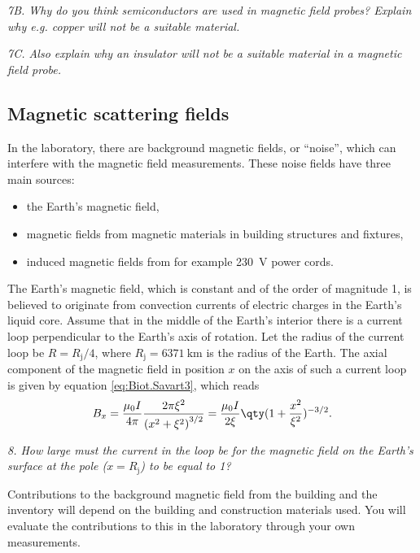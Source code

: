 \documentclass[../Elmag-labhefte-2020.tex]{subfiles}
\begin{document}
\emph{7B. Why do you think semiconductors are used in magnetic field probes? Explain why e.g. copper will not be a suitable material.}

\emph{7C. Also explain why an insulator will not be a suitable material in a magnetic field probe.}


\subsection{Magnetic scattering fields}

In the laboratory, there are background magnetic fields, or ``noise'', which can interfere with the magnetic field measurements.
These noise fields have three main sources:
\vspace{-4mm}
\begin{itemize}
    \item the Earth's magnetic field,
    \item magnetic fields from magnetic materials in building structures and fixtures,
    \item induced magnetic fields from for example \SI{230}{\volt} power cords.
\end{itemize}

The Earth's magnetic field, which is constant and of the order of magnitude \SI{1}{\gauss}, is believed to originate from convection currents of electric charges in the Earth's liquid core. Assume that in the middle of the Earth's interior there is a current loop perpendicular to the Earth's axis of rotation. Let the radius of the current loop be $R = R_\text{j}/4$, where $R_\text{j} = \SI{6371}{\km}$ is the radius of the Earth. The axial component of the magnetic field in position $x$ on the axis of such a current loop is given by equation \eqref{eq:Biot.Savart3}, which reads
\[
  B_x = \frac{\mu_0 I}{4 \pi} \frac{2\pi \xi^2}{\left( x^2 + \xi^2 \right)^{3/2}}
      = \frac{\mu_0 I}{2 \xi} \qty(1 + \frac{x^2}{\xi^2})^{-3/2}.
\]

\emph{ 8. How large must the current in the loop be for the magnetic field on the Earth's surface at the pole ($x = R_\text{j}$) to be equal to \SI{1}{\gauss}? }


Contributions to the background magnetic field from the building and the inventory will depend on the building and construction materials used. You will evaluate the contributions to this in the laboratory through your own measurements.
\end{document}
